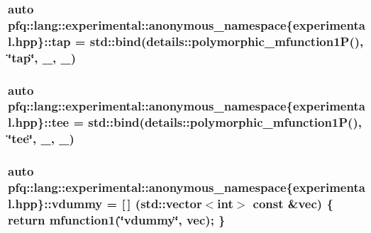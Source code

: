 \hypertarget{namespacepfq_1_1lang_1_1experimental_1_1anonymous__namespace_02experimental_8hpp_03_a66641cfa5d43270458e7fbfb626d0e2e}{
\subsubsection[{tap}]{\setlength{\rightskip}{0pt plus 5cm}auto pfq\+::lang\+::experimental\+::anonymous\+\_\+namespace\{experimental.\+hpp\}\+::tap = std\+::bind(details\+::polymorphic\+\_\+mfunction1\+P(), \char`\"{}tap\char`\"{}, \+\_, \+\_)}}\label{namespacepfq_1_1lang_1_1experimental_1_1anonymous__namespace_02experimental_8hpp_03_a66641cfa5d43270458e7fbfb626d0e2e}
\hypertarget{namespacepfq_1_1lang_1_1experimental_1_1anonymous__namespace_02experimental_8hpp_03_a1c49a70b83c2e42067c558a8bfcf8211}{
\subsubsection[{tee}]{\setlength{\rightskip}{0pt plus 5cm}auto pfq\+::lang\+::experimental\+::anonymous\+\_\+namespace\{experimental.\+hpp\}\+::tee = std\+::bind(details\+::polymorphic\+\_\+mfunction1\+P(), \char`\"{}tee\char`\"{}, \+\_, \+\_)}}\label{namespacepfq_1_1lang_1_1experimental_1_1anonymous__namespace_02experimental_8hpp_03_a1c49a70b83c2e42067c558a8bfcf8211}
\hypertarget{namespacepfq_1_1lang_1_1experimental_1_1anonymous__namespace_02experimental_8hpp_03_a2226c8f9da114edfb9d457189dde1cbe}{
\subsubsection[{vdummy}]{\setlength{\rightskip}{0pt plus 5cm}auto pfq\+::lang\+::experimental\+::anonymous\+\_\+namespace\{experimental.\+hpp\}\+::vdummy = \mbox{[}$\,$\mbox{]} (std\+::vector$<$int$>$ const \&vec) \{ return {\bf mfunction1}(\char`\"{}vdummy\char`\"{}, vec); \}}}\label{namespacepfq_1_1lang_1_1experimental_1_1anonymous__namespace_02experimental_8hpp_03_a2226c8f9da114edfb9d457189dde1cbe}
